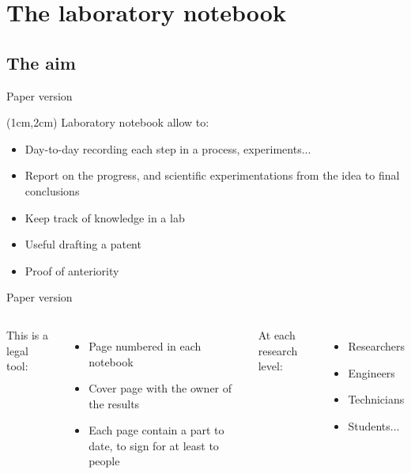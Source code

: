 \section{The laboratory notebook}
\subsection{The aim}
\begin{frame}[<+->]{Paper version}
\begin{textblock*}{10cm}(1cm,2cm) %
Laboratory notebook allow to:
\begin{itemize}
	\item Day-to-day recording each step in a process, experiments...
	\item Report on the progress, and scientific experimentations \newline
	from the idea to final conclusions
	\item Keep track of knowledge in a lab
	\item Useful drafting a patent
	\item Proof of anteriority
\end{itemize}
\end{textblock*}
\end{frame}

\begin{frame}[<+->]{Paper version}
\begin{columns}
This is a legal tool:
 \begin{itemize}
 \item Page numbered in each notebook
 \item Cover page with the owner of the results
 \item Each page contain a part to date, to sign for at least to people
 \end{itemize}
At each research level:
  \begin{itemize}
 \item Researchers
 \item Engineers
 \item Technicians
 \item Students...
 \end{itemize}
\end{columns}
\vspace{1cm}
\end{frame}

